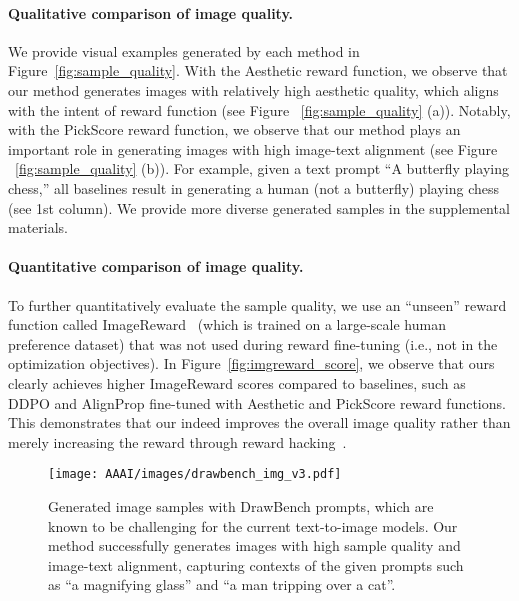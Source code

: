\paragraph{Qualitative comparison of image quality.}
We provide visual examples generated by each method in Figure~\ref{fig:sample_quality}. 
With the Aesthetic reward function, we observe that our method generates images with relatively high aesthetic quality, which aligns with the intent of reward function (see Figure ~\ref{fig:sample_quality} (a)). Notably, with the PickScore reward function, we observe that our method plays an important role in generating images with high image-text alignment (see Figure ~\ref{fig:sample_quality} (b)). For example, given a text prompt ``A butterfly playing chess,'' all baselines result in generating a human (not a butterfly) playing chess (see 1st column). We provide more diverse generated samples in the supplemental materials.

\paragraph{Quantitative comparison of image quality.}
To further quantitatively evaluate the sample quality, we use an ``unseen'' reward function called ImageReward~\cite{imagereward} (which is trained on a large-scale human preference dataset) that was not used during reward fine-tuning (i.e., not in the optimization objectives). In Figure~\ref{fig:imgreward_score}, we observe that ours clearly achieves higher ImageReward scores compared to baselines, such as DDPO and AlignProp fine-tuned with Aesthetic and PickScore reward functions. This demonstrates that our \metabbr indeed improves the overall image quality rather than merely increasing the reward through reward hacking~\cite{scaling_law_overopt, kim2024confidenceaware}.


\begin{figure}[t]
  \centering
  \texttt{[image: AAAI/images/drawbench\_img\_v3.pdf]}
  \caption{Generated image samples with DrawBench prompts, which are known to be challenging for the current text-to-image models. Our method successfully generates images with high sample quality and image-text alignment, capturing contexts of the given prompts such as ``a magnifying glass'' and ``a man tripping over a cat''. 
  }
  \label{fig:drawbench_img}
\end{figure}


